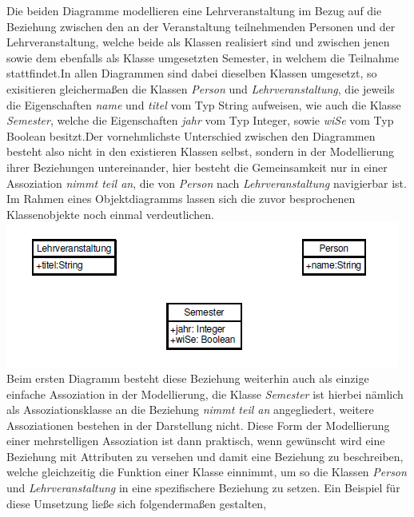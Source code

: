 \documentclass{swp1}
\begin{document}
Die beiden Diagramme modellieren eine Lehrveranstaltung im Bezug auf die Beziehung zwischen den an der Veranstaltung teilnehmenden Personen und der Lehrveranstaltung, welche beide als Klassen realisiert sind und zwischen jenen sowie dem ebenfalls als Klasse umgesetzten Semester, in welchem die Teilnahme stattfindet.In allen Diagrammen sind dabei dieselben Klassen umgesetzt, so exisitieren gleichermaßen die Klassen \emph{Person} und \emph{Lehrveranstaltung}, die jeweils die Eigenschaften \emph{name} und \emph{titel} vom Typ String aufweisen, wie auch die Klasse \emph{Semester}, welche die Eigenschaften \emph{jahr} vom Typ Integer, sowie \emph{wiSe} vom Typ Boolean besitzt.Der vornehmlichste Unterschied zwischen den Diagrammen besteht also nicht in den existieren Klassen selbst, sondern in der Modellierung ihrer Beziehungen untereinander, hier besteht die Gemeinsamkeit nur in einer Assoziation \emph{nimmt teil an}, die von \emph{Person} nach \emph{Lehrveranstaltung} navigierbar ist.\newline
\newline
Im Rahmen eines Objektdiagramms lassen sich die zuvor besprochenen Klassenobjekte noch einmal verdeutlichen.\newline
\newline
\includegraphics{Objektdiagramm}
\newline
Beim ersten Diagramm besteht diese Beziehung weiterhin auch als einzige einfache Assoziation in der Modellierung, die Klasse \emph{Semester} ist hierbei nämlich als Assoziationsklasse an die Beziehung \emph{nimmt teil an} angegliedert, weitere Assoziationen bestehen in der Darstellung nicht. Diese Form der Modellierung einer mehrstelligen Assoziation ist dann praktisch, wenn gewünscht wird eine Beziehung mit Attributen zu versehen und damit eine Beziehung zu beschreiben, welche gleichzeitig die Funktion einer Klasse einnimmt, um so die Klassen \emph{Person} und \emph{Lehrveranstaltung} in eine spezifischere Beziehung zu setzen.\newline
Ein Beispiel für diese Umsetzung ließe sich folgendermaßen gestalten,
\end{document}
